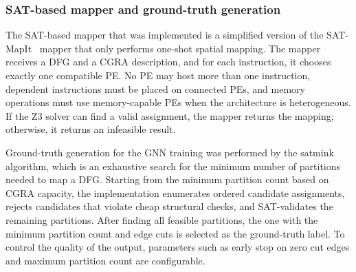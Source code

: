 \subsubsection{SAT-based mapper and ground-truth generation}

The SAT-based mapper that was implemented is a simplified version of the SAT-MapIt~\cite{satmapit2023} mapper that only performs one-shot spatial mapping. The mapper receives a DFG and a CGRA description, and for each instruction, it chooses exactly one compatible PE\@. No PE may host more than one instruction, dependent instructions must be placed on connected PEs, and memory operations must use memory-capable PEs when the architecture is heterogeneous. If the Z3 solver can find a valid assignment, the mapper returns the mapping; otherwise, it returns an infeasible result.

Ground-truth generation for the GNN training was performed by the \gls{satmink} algorithm, which is an exhaustive search for the minimum number of partitions needed to map a DFG\@. Starting from the minimum partition count based on CGRA capacity, the implementation enumerates ordered candidate assignments, rejects candidates that violate cheap structural checks, and SAT-validates the remaining partitions. After finding all feasible partitions, the one with the minimum partition count and edge cuts is selected as the ground-truth label. To control the quality of the output, parameters such as early stop on zero cut edges and maximum partition count are configurable.

%
%

